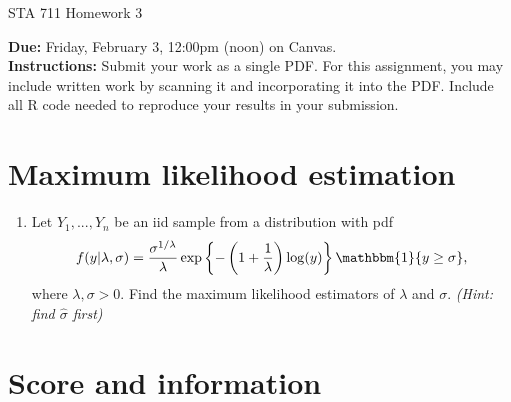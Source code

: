 \documentclass[11pt]{article}
\begin{document}
\begin{center}
\Large
STA 711 Homework 3\\
\normalsize
\vspace{5mm}
\end{center}

\noindent \textbf{Due:} Friday, February 3, 12:00pm (noon) on Canvas.\\ 

\noindent \textbf{Instructions:} Submit your work as a single PDF. For this assignment, you may include written work by scanning it and incorporating it into the PDF. Include all R code needed to reproduce your results in your submission.

\section*{Maximum likelihood estimation}

\begin{enumerate}
\item Let $Y_1,...,Y_n$ be an iid sample from a distribution with pdf 
$$f(y | \lambda, \sigma) = \dfrac{\sigma^{1/\lambda}}{\lambda} \exp \left\lbrace -\left(1 + \frac{1}{\lambda}\right) \log(y) \right\rbrace \mathbbm{1}\{ y \geq \sigma \},$$
where $\lambda, \sigma > 0$. Find the maximum likelihood estimators of $\lambda$ and $\sigma$. \textit{(Hint: find $\widehat{\sigma}$ first)}
\end{enumerate}

\section*{Score and information}
\end{document}
